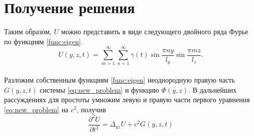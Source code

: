 \section{Получение решения}

Таким образом, $U$ можно представить в виде следующего двойного ряда Фурье по функциям \eqref{func:eigen}.
\begin{equation}
  \label{eq:u-series}
  U(y, z, t) = \displaystyle \sum_{m=1}^{\infty}\sum_{n=1}^{\infty} \gamma(t) \sin\frac{\pi n y}{l_y} \sin\frac{\pi m z}{l_z}.
\end{equation}
\\
Разложим собственным функциям \eqref{func:eigen} неоднородную правую часть $G(y, z, t)$ системы \eqref{eq:new_problem} и функцию $\Phi(y, z)$. В дальнейших рассуждениях для простоты умножим левую и правую части первого уравнения \eqref{eq:new_problem} на $c^2$, получив
\begin{equation}
  \label{eq:new_eq_simple}
  \frac{\partial^2 U}{\partial t^2} = \Delta_{yz} U + c^2G(y, z, t)
\end{equation}

